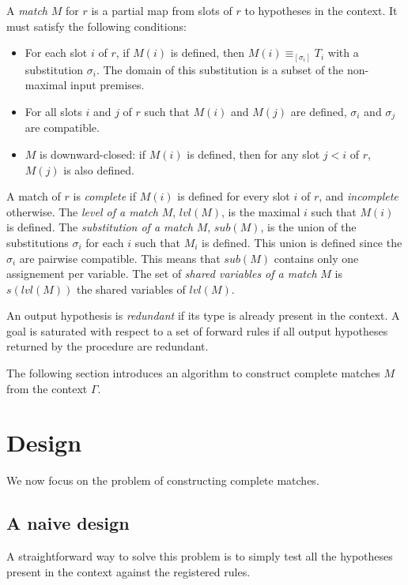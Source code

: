 \documentclass[runningheads]{llncs}
\begin{document}
A \textit{match} $M$ for $r$ is a partial map from slots of $r$ to hypotheses in the context.
It must satisfy the following conditions:
\begin{itemize}
  \item For each slot $i$ of $r$, if $M(i)$ is defined, then $M(i) \equiv_{[\sigma_i]} T_i$ with a substitution $\sigma_i$.
        The domain of this substitution is a subset of the non-maximal input premises.
  \item For all slots $i$ and $j$ of $r$ such that $M(i)$ and $M(j)$ are defined, $\sigma_i$ and $\sigma_j$ are compatible.
  \item $M$ is downward-closed: if $M(i)$ is defined, then for any slot $j < i$ of $r$, $M(j)$ is also defined.
\end{itemize}

A match of $r$ is \textit{complete} if $M(i)$ is defined for every slot $i$ of $r$, and \textit{incomplete} otherwise.
The \textit{level of a match} $M$, $lvl(M)$, is the maximal $i$ such that $M(i)$ is defined.
The \textit{substitution of a match} $M$, $sub(M)$, is the union of the substitutions $\sigma_i$ for each $i$ such that $M_i$ is defined.
This union is defined since the $\sigma_i$ are pairwise compatible.
This means that $sub(M)$ contains only one assignement per variable.
The set of \textit{shared variables of a match} $M$ is $s(lvl(M))$ the shared variables of $lvl(M)$.

An output hypothesis is \textit{redundant} if its type is already present in the context.
A goal is saturated with respect to a set of forward rules if all output hypotheses returned by the procedure are redundant.

The following section introduces an algorithm to construct complete matches $M$ from the context $\Gamma$.

\section{Design}

We now focus on the problem of constructing complete matches.

\subsection{A naive design}

A straightforward way to solve this problem is to simply test all the hypotheses present in the context against the registered rules.
\end{document}
